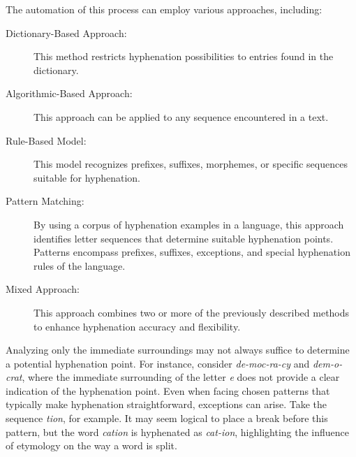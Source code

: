 
The automation of this process can employ various approaches, including:
\begin{description}
\item[Dictionary-Based Approach:] This method restricts hyphenation
    possibilities to entries found in the dictionary.
\item[Algorithmic-Based Approach:] This approach can be applied to any sequence
    encountered in a text.
\item[Rule-Based Model:] This model recognizes prefixes, suffixes, morphemes,
    or specific sequences suitable for hyphenation.
\item[Pattern Matching:] By using a corpus of hyphenation examples in a
    language, this approach identifies letter sequences that determine suitable
    hyphenation points. Patterns encompass prefixes, suffixes, exceptions, and
    special hyphenation rules of the language.
\item[Mixed Approach:] This approach combines two or more of the previously
    described methods to enhance hyphenation accuracy and flexibility.
\end{description}

Analyzing only the immediate surroundings may not always suffice to determine a
potential hyphenation point. For instance, consider \emph{de-moc-ra-cy} and \emph{dem-o-crat},
where the immediate surrounding of the letter \emph{e} does not provide a clear
indication of the hyphenation point. 
Even when facing chosen patterns that typically make hyphenation
straightforward, exceptions can arise. Take the sequence \emph{tion}, for example.
It may seem logical to place a break before this pattern, but the word \emph{cation}
is hyphenated as \emph{cat-ion}, highlighting the influence of etymology on the way
a word is split.

